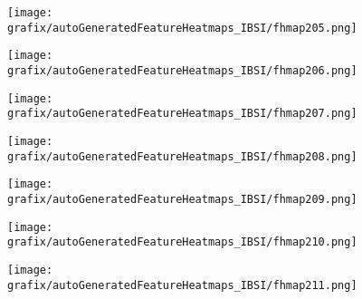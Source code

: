 \hspace{\hsp} 
\begin{subfigure}{\wid\textwidth} 
    \centering 
    \caption{\tiny \sffamily {}} 
    \vspace{\vsp} 
    \texttt{[image: grafix/autoGeneratedFeatureHeatmaps\_IBSI/fhmap205.png]} 
\end{subfigure} 
\hspace{\hsp} 
\begin{subfigure}{\wid\textwidth} 
    \centering 
    \caption{\tiny \sffamily {}} 
    \vspace{\vsp} 
    \texttt{[image: grafix/autoGeneratedFeatureHeatmaps\_IBSI/fhmap206.png]} 
\end{subfigure} 
\hspace{\hsp} 
\begin{subfigure}{\wid\textwidth} 
    \centering 
    \caption{\tiny \sffamily {}} 
    \vspace{\vsp} 
    \texttt{[image: grafix/autoGeneratedFeatureHeatmaps\_IBSI/fhmap207.png]} 
\end{subfigure} 
\hspace{\hsp} 
\begin{subfigure}{\wid\textwidth} 
    \centering 
    \caption{\tiny \sffamily {}} 
    \vspace{\vsp} 
    \texttt{[image: grafix/autoGeneratedFeatureHeatmaps\_IBSI/fhmap208.png]} 
\end{subfigure} 
\hspace{\hsp} 
\begin{subfigure}{\wid\textwidth} 
    \centering 
    \caption{\tiny \sffamily {}} 
    \vspace{\vsp} 
    \texttt{[image: grafix/autoGeneratedFeatureHeatmaps\_IBSI/fhmap209.png]} 
\end{subfigure} 
\hspace{\hsp} 
\begin{subfigure}{\wid\textwidth} 
    \centering 
    \caption{\tiny \sffamily {}} 
    \vspace{\vsp} 
    \texttt{[image: grafix/autoGeneratedFeatureHeatmaps\_IBSI/fhmap210.png]} 
\end{subfigure} 
\hspace{\hsp} 
\begin{subfigure}{\wid\textwidth} 
    \centering 
    \caption{\tiny \sffamily {}} 
    \vspace{\vsp} 
    \texttt{[image: grafix/autoGeneratedFeatureHeatmaps\_IBSI/fhmap211.png]} 
\end{subfigure} 
